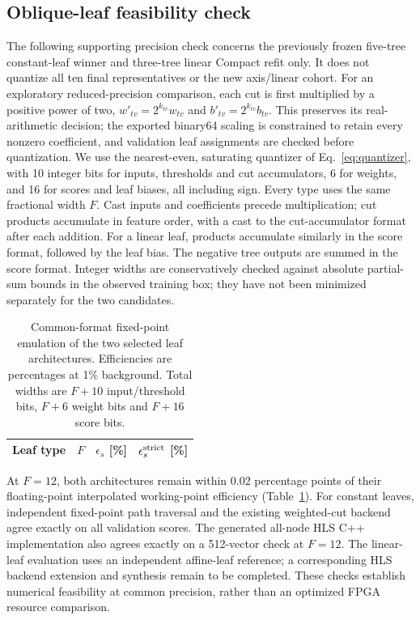 \subsection{Oblique-leaf feasibility check}
The following supporting precision check concerns the previously frozen
five-tree constant-leaf winner and three-tree linear Compact refit only.
It does not quantize all ten final representatives or the new axis/linear cohort.
For an exploratory reduced-precision comparison, each cut is first multiplied
by a positive power of two, $w'_{tv}=2^{k_{tv}}w_{tv}$ and
$b'_{tv}=2^{k_{tv}}b_{tv}$. This preserves its real-arithmetic decision; the
exported binary64 scaling is constrained to retain every nonzero coefficient,
and validation leaf assignments are checked before quantization.
We use the nearest-even, saturating quantizer of Eq.~\eqref{eq:quantizer}, with
10 integer bits for inputs, thresholds and cut accumulators, 6 for weights,
and 16 for scores and leaf biases, all including sign. Every type uses the
same fractional width $F$. Cast inputs and coefficients precede multiplication;
cut products accumulate in feature order, with a cast to the cut-accumulator
format after each addition. For a linear leaf, products accumulate similarly
in the score format, followed by the leaf bias. The negative tree outputs are
summed in the score format. Integer widths are conservatively checked against
absolute partial-sum bounds in the observed training box; they have not been
minimized separately for the two candidates.

\begin{table}[htbp]\centering\small
\caption{Common-format fixed-point emulation of the two selected leaf
architectures. Efficiencies are percentages at 1\% background. Total widths
are $F+10$ input/threshold bits, $F+6$ weight bits and $F+16$ score bits.}
\label{tab:leafprecision}
\begin{tabular}{@{}lrrr@{}}\toprule
Leaf type & $F$ & $\epsilon_s$ [\%] & $\epsilon_s^{\rm strict}$ [\%]\\\midrule
\end{tabular}
\end{table}
At $F=12$, both architectures remain within 0.02 percentage points of their
floating-point interpolated working-point efficiency (Table~\ref{tab:leafprecision}).
For constant leaves, independent fixed-point path traversal and the existing
weighted-cut backend agree exactly on all validation scores. The generated
all-node HLS C++ implementation also agrees exactly on a 512-vector check at
$F=12$. The linear-leaf evaluation uses an independent affine-leaf reference;
a corresponding HLS backend extension and synthesis remain to be completed.
These checks establish numerical feasibility at common precision, rather than
an optimized FPGA resource comparison.


